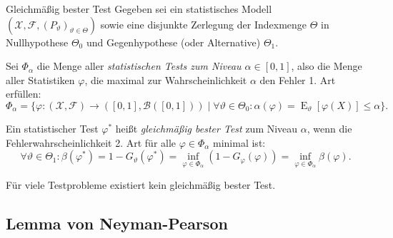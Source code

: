 \begin{defi}{Gleichmäßig bester Test}
    Gegeben sei ein statistisches Modell $(\mathcal{X}, \mathcal{F}, (P_{\vartheta})_{\vartheta \in \Theta})$ sowie eine disjunkte Zerlegung der Indexmenge $\Theta$ in Nullhypothese $\Theta_0$ und Gegenhypothese (oder Alternative) $\Theta_1$.

    Sei $\Phi_{\alpha}$ die Menge aller \emph{statistischen Tests zum Niveau $\alpha \in [0, 1]$}, also die Menge aller Statistiken $\varphi$, die maximal zur Wahrscheinlichkeit $\alpha$ den Fehler 1. Art erfüllen:
    \[
        \Phi_{\alpha} = \{\varphi: (\mathcal{X}, \mathcal{F}) \to ([0, 1], \mathcal{B}([0, 1])) \mid \forall \vartheta \in \Theta_0 : \alpha(\varphi) = \operatorname{E}_{\vartheta}[\varphi(X)] \leq \alpha \}.
    \]

    Ein statistischer Test $\varphi^*$ heißt \emph{gleichmäßig bester Test} zum Niveau $\alpha$, wenn die Fehlerwahrscheinlichkeit 2. Art für alle $\varphi \in \Phi_{\alpha}$ minimal ist:
    \[
        \forall \vartheta \in \Theta_{1} : \beta(\varphi^*) = 1 - G_{\vartheta}(\varphi^*) = \inf_{\varphi \in \Phi_{\alpha}} (1 - G_{\varphi}(\varphi)) = \inf_{\varphi \in \Phi_{\alpha}} \beta(\varphi).
    \]

    Für viele Testprobleme existiert kein gleichmäßig bester Test.
\end{defi}

\subsection{Lemma von Neyman-Pearson}

